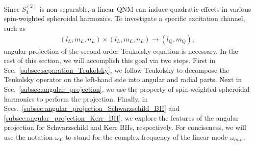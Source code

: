 \documentclass[aps,prd,amsmath,floats,floatfix, twocolumn,
superscriptaddress,nofootinbib,showpacs]{revtex4-1}
\begin{document}
Since $S_4^{(2)}$ is non-separable, a linear QNM can induce quadratic effects in various spin-weighted spheroidal harmonics. To investigate a specific excitation channel, such as 
\begin{align}
    (l_L,m_L,n_L)\times (l_L,m_L,n_L) \to (l_Q,m_Q), \label{eq:excitation_channel}
\end{align}
angular projection of the second-order Teukolsky equation is necessary. In the rest of this section, we will accomplish this goal via two steps. First in Sec.~\ref{subsec:separation_Teukolsky}, we follow Teukolsky \cite{Teukolsky:1973ApJ} to decompose the Teukolsky operator on the left-hand side into angular and radial parts. Next in Sec.~\ref{subsec:angular_projection}, we use the property of spin-weighted spheroidal harmonics to perform the projection. Finally, in Secs.~\ref{subsec:angular_projection_Schwarzschild_BH} and \ref{subsec:angular_projection_Kerr_BH}, we explore the features of the angular projection for Schwarzschild and Kerr BHs, respectively. For conciseness, we will use the notation $\omega_L$ to stand for the complex frequency of the linear mode $\omega_{lmn}$.
\end{document}

